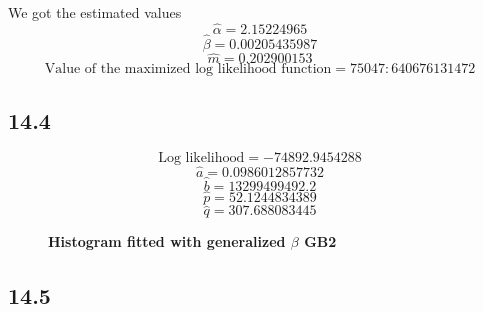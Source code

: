 \documentclass[letterpaper,12pt]{article}
\theoremstyle{definition}
\begin{document}
We got the estimated values 
\[\hat{\alpha}=2.15224965\]
\[\hat{\beta}=0.00205435987\]
\[\hat{m}=0.202900153\]
\[\text{Value of the maximized log likelihood function} = 75047:640676131472\]
\subsection*{14.4}


\noindent \[\text{Log likelihood} =  -74892.9454288\]
\[\hat{a} =  0.0986012857732\]
\[\hat{b} =  13299499492.2\]
\[\hat{p} =  52.1244834389\]
\[\hat{q} =  307.688083445\]

\begin{figure}[htb]\centering \captionsetup{width=4.0in}
        \caption{\label{Histogram<800}\textbf{Histogram fitted with generalized $\beta$ GB2}}
\end{figure}


\subsection*{14.5}
\end{document}
